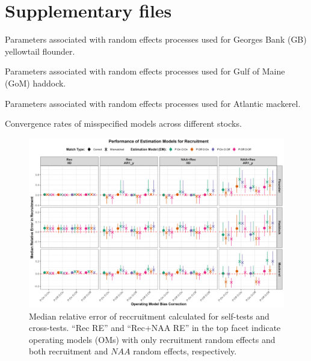 \documentclass[
  12pt,
]{article}
\begin{document}
\hypertarget{supplementary-files}{%
\section{Supplementary files}\label{supplementary-files}}

\renewcommand{\thetable}{S\arabic{table}}
\setcounter{table}{0}

\begin{table}[H]
    \centering
    \caption{Parameters associated with random effects processes used for Georges Bank (GB) yellowtail flounder.}
    \label{supp_flounder_table}
    
\end{table}

\begin{table}[H]
    \centering
    \caption{Parameters associated with random effects processes used for Gulf of Maine (GoM) haddock.}
    \label{supp_haddock_table}
    
\end{table}

\begin{table}[H]
    \centering
    \caption{Parameters associated with random effects processes used for Atlantic mackerel.}
    \label{supp_mackerel_table}
    
\end{table}

\begin{table}[H]
    \centering
    \caption{Convergence rates of misspecified models across different stocks.}
    \label{supp_convergence_tab}
    
\end{table}

\renewcommand{\thetable}{\arabic{table}}

\renewcommand{\thefigure}{S\arabic{figure}}
\setcounter{figure}{0}

\begin{figure}[H]
\centering
\includegraphics[width=\textwidth]{Revised_Figures&Tables/OM_EM_Comparison_Plot_Rec.PNG}
\caption{Median relative error of reccruitment calculated for self-tests and cross-tests. ``Rec RE'' and ``Rec+NAA RE'' in the top facet indicate operating models (OMs) with only recruitment random effects and both recruitment and $NAA$ random effects, respectively.}
\label{fig:supp_OM_EM_Comparison_Plot_Rec}
\end{figure}
\end{document}
